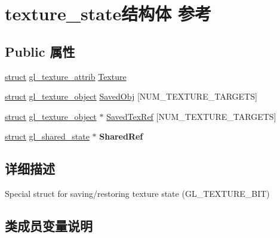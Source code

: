 \hypertarget{structtexture__state}{}\section{texture\+\_\+state结构体 参考}
\label{structtexture__state}
\subsection*{Public 属性}
\begin{DoxyCompactItemize}
\item 
\hyperlink{interfacestruct}{struct} \hyperlink{structgl__texture__attrib}{gl\+\_\+texture\+\_\+attrib} \hyperlink{structtexture__state_a68291c6540890e8155771cb8f35cfea7}{Texture}
\item 
\hyperlink{interfacestruct}{struct} \hyperlink{structgl__texture__object}{gl\+\_\+texture\+\_\+object} \hyperlink{structtexture__state_a8c34795feda468479e743e9549808f42}{Saved\+Obj} \mbox{[}N\+U\+M\+\_\+\+T\+E\+X\+T\+U\+R\+E\+\_\+\+T\+A\+R\+G\+E\+TS\mbox{]}
\item 
\hyperlink{interfacestruct}{struct} \hyperlink{structgl__texture__object}{gl\+\_\+texture\+\_\+object} $\ast$ \hyperlink{structtexture__state_ac3d2463544a34245ad079ad67cc80979}{Saved\+Tex\+Ref} \mbox{[}N\+U\+M\+\_\+\+T\+E\+X\+T\+U\+R\+E\+\_\+\+T\+A\+R\+G\+E\+TS\mbox{]}
\item 
\mbox{\label{structtexture__state_a232a3f44da21b05c837eca8972b2a8cd}} 
\hyperlink{interfacestruct}{struct} \hyperlink{structgl__shared__state}{gl\+\_\+shared\+\_\+state} $\ast$ {\bfseries Shared\+Ref}
\end{DoxyCompactItemize}


\subsection{详细描述}
Special struct for saving/restoring texture state (G\+L\+\_\+\+T\+E\+X\+T\+U\+R\+E\+\_\+\+B\+IT) 

\subsection{类成员变量说明}
\mbox{\label{structtexture__state_a8c34795feda468479e743e9549808f42}} 
